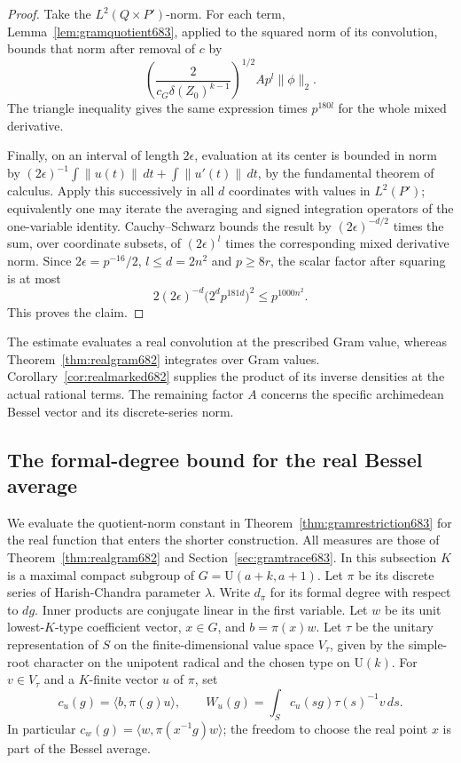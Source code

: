 \documentclass[a4paper,11pt]{article}
\theoremstyle{definition}
\theoremstyle{remark}
\numberwithin{equation}{section}
\begin{document}
\begin{proof}
Take the \(L^2(Q\times P')\)-norm. For each term,
Lemma~\ref{lem:gramquotient683}, applied to the squared norm
of its convolution, bounds that norm after removal of \(c\) by
\[
           \left(\frac{2}{c_G\delta(Z_0)^{k-1}}\right)^{1/2}
                      A p^l\|\phi\|_2 .
\]
The triangle inequality gives the same expression times
\(p^{180l}\) for the whole mixed derivative.

Finally, on an interval of length \(2\epsilon\), evaluation
at its center is bounded in norm by
\((2\epsilon)^{-1}\int\|u(t)\|\,dt+\int\|u'(t)\|\,dt\),
by the fundamental theorem of calculus. Apply this successively
in all \(d\) coordinates with values in \(L^2(P')\); equivalently
one may iterate the averaging and signed integration operators
of the one-variable identity. Cauchy--Schwarz bounds the result
by \((2\epsilon)^{-d/2}\) times the sum, over coordinate subsets,
of \((2\epsilon)^l\) times the corresponding mixed derivative
norm. Since \(2\epsilon=p^{-16}/2\), \(l\le d=2n^2\) and
\(p\ge8r\), the scalar factor after squaring is at most
\[
  2(2\epsilon)^{-d}\big(2^d p^{181d}\big)^2
       \le p^{1000n^2}.
\]
This proves the claim.
\end{proof}

The estimate evaluates a real convolution at the prescribed
Gram value, whereas Theorem~\ref{thm:realgram682} integrates
over Gram values. Corollary~\ref{cor:realmarked682} supplies
the product of its inverse densities at the actual rational
terms. The remaining factor \(A\) concerns the specific
archimedean Bessel vector and its discrete-series norm.


\subsection{The formal-degree bound for the real Bessel average}
\label{sec:besselschu684}

We evaluate the quotient-norm constant in
Theorem~\ref{thm:gramrestriction683} for the real function
that enters the shorter construction. All measures are those
of Theorem~\ref{thm:realgram682} and Section~\ref{sec:gramtrace683}.
In this subsection \(K\) is a maximal compact subgroup of
\(G=\mathrm U(a+k,a+1)\). Let \(\pi\) be its discrete series of
Harish-Chandra parameter \(\lambda\). Write \(d_\pi\) for its
formal degree with respect to \(dg\). Inner products are
conjugate linear in the first variable. Let \(w\) be its unit
lowest-\(K\)-type coefficient vector, \(x\in G\), and
\(b=\pi(x)w\). Let \(\tau\) be the unitary representation
of \(S\) on the finite-dimensional value space \(V_\tau\),
given by the simple-root character on the unipotent radical
and the chosen type on \(\mathrm U(k)\). For \(v\in V_\tau\)
and a \(K\)-finite vector \(u\) of \(\pi\), set
\[
 c_u(g)=\langle b,\pi(g)u\rangle,\qquad
 W_u(g)=\int_S c_u(sg)\tau(s)^{-1}v\,ds .
\]
In particular \(c_w(g)=\langle w,\pi(x^{-1}g)w\rangle\);
the freedom to choose the real point \(x\) is part of the
Bessel average.
\end{document}
